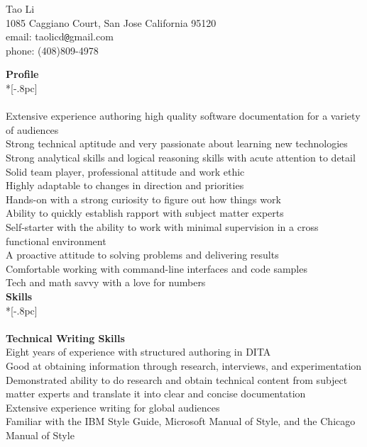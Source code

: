 \documentclass[11pt]{extarticle}
\begin{document}
\begin{center}
{\Large Tao Li} \\[0.2pc]
1085 Caggiano Court, San Jose California  95120 \\
email: taolicd\verb|@|gmail.com \\
 phone: (408)809-4978     \\

\end{center}

{\large \bf Profile} \\*[-.8pc]
\underline{\hspace{6.55in}} \\
\\
Extensive experience authoring high quality software documentation for a variety of audiences  \\
Strong technical aptitude and very passionate about learning new technologies\\
Strong analytical skills and logical reasoning skills with acute attention to detail\\
Solid team player, professional attitude and work ethic\\
Highly adaptable to changes in direction and priorities\\
Hands-on with a strong curiosity  to figure out how things work\\
Ability to quickly establish rapport with subject matter experts\\
Self-starter with the ability to work with minimal supervision in a cross functional environment\\
A proactive attitude to solving problems and delivering results\\
Comfortable working with command-line interfaces and code samples\\
Tech and math savvy with a love for numbers\\


{\large \bf Skills} \\*[-.8pc]
\underline{\hspace{6.55in}} \\
\\
{\bf Technical Writing Skills} \\
Eight years of experience with structured authoring in DITA\\
Good at obtaining information through research, interviews, and experimentation\\
Demonstrated ability to do research and obtain technical content from subject matter experts and translate it into clear and concise documentation\\
 Extensive experience writing for global audiences\\
 Familiar with the IBM Style Guide, Microsoft Manual of Style, and the Chicago Manual of Style\\
\end{document}
